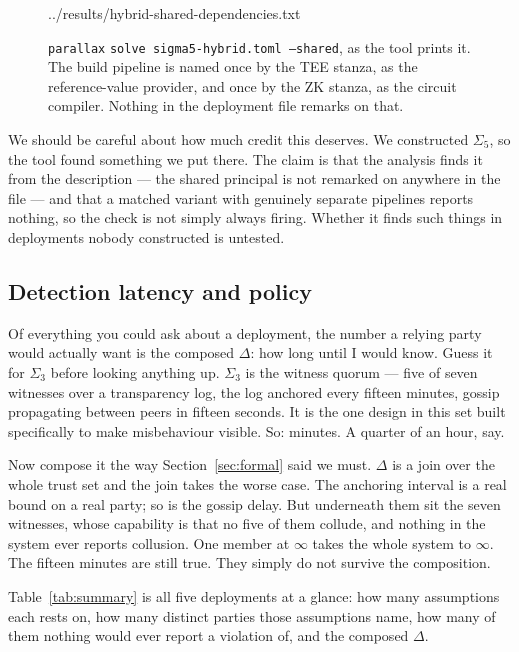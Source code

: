 \documentclass[11pt]{article}
\newcommand{\parallax}{\texttt{parallax}}
\newcommand{\Never}{\infty}
\begin{document}
\begin{figure}[h]
%
                {../results/hybrid-shared-dependencies.txt}
\caption{\parallax{} \texttt{solve sigma5-hybrid.toml --shared}, as the tool
prints it. The build pipeline is named once by the TEE stanza, as the
reference-value provider, and once by the ZK stanza, as the circuit compiler.
Nothing in the deployment file remarks on that.}
\label{fig:shared}
\end{figure}

We should be careful about how much credit this deserves. We constructed
$\Sigma_5$, so the tool found something we put there. The claim is that the
analysis finds it from the description --- the shared principal is not
remarked on anywhere in the file --- and that a matched variant with genuinely
separate pipelines reports nothing, so the check is not simply always firing.
Whether it finds such things in deployments nobody constructed is untested.

\subsection{Detection latency and policy}
\label{sec:latencyeval}

Of everything you could ask about a deployment, the number a relying party
would actually want is the composed $\Delta$: how long until I would know.
Guess it for $\Sigma_3$ before looking anything up. $\Sigma_3$ is the witness
quorum --- five of seven witnesses over a transparency log, the log anchored
every fifteen minutes, gossip propagating between peers in fifteen seconds.
It is the one design in this set built specifically to make misbehaviour
visible. So: minutes. A quarter of an hour, say.

Now compose it the way Section~\ref{sec:formal} said we must. $\Delta$ is a
join over the whole trust set and the join takes the worse case. The
anchoring interval is a real bound on a real party; so is the gossip delay.
But underneath them sit the seven witnesses, whose capability is that no five
of them collude, and nothing in the system ever reports collusion. One member
at $\Never$ takes the whole system to $\Never$. The fifteen minutes are still
true. They simply do not survive the composition.

Table~\ref{tab:summary} is all five deployments at a glance: how many
assumptions each rests on, how many distinct parties those assumptions name,
how many of them nothing would ever report a violation of, and the composed
$\Delta$.
\end{document}
